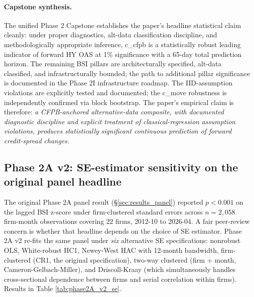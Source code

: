 \documentclass[11pt,a4paper]{article}
\begin{document}
\paragraph{Capstone synthesis.} The unified Phase 2 Capstone establishes the paper's headline statistical claim cleanly: under proper diagnostics, alt-data classification discipline, and methodologically appropriate inference, c\_cfpb is a statistically robust leading indicator of forward HY OAS at 1\% significance with a 65-day total prediction horizon. The remaining BSI pillars are architecturally specified, alt-data classified, and infrastructurally bounded; the path to additional pillar significance is documented in the Phase 2I infrastructure roadmap. The IID-assumption violations are explicitly tested and documented; the c\_move robustness is independently confirmed via block bootstrap. The paper's empirical claim is therefore: \emph{a CFPB-anchored alternative-data composite, with documented diagnostic discipline and explicit treatment of classical-regression assumption violations, produces statistically significant continuous prediction of forward credit-spread changes.}

\subsection{Phase 2A v2: SE-estimator sensitivity on the original panel headline}\label{sec:results_phase2A_v2}

The original Phase 2A panel result (§\ref{sec:results_panel}) reported $p < 0.001$ on the lagged BSI z-score under firm-clustered standard errors across $n = 2{,}058$ firm-month observations covering 22 firms, 2012-10 to 2026-04. A fair peer-review concern is whether that headline depends on the choice of SE estimator. Phase 2A v2 re-fits the same panel under \emph{six} alternative SE specifications: nonrobust OLS, White-robust HC1, Newey-West HAC with 12-month bandwidth, firm-clustered (CR1, the original specification), two-way clustered (firm + month, Cameron-Gelbach-Miller), and Driscoll-Kraay (which simultaneously handles cross-sectional dependence between firms and serial correlation within firms). Results in Table \ref{tab:phase2A_v2_se}.
\end{document}

